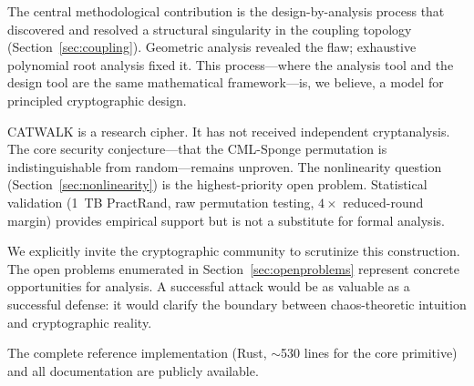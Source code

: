 \documentclass[runningheads]{llncs}
\begin{document}
The central methodological contribution is the design-by-analysis process
that discovered and resolved a structural singularity in the coupling topology
(Section~\ref{sec:coupling}).  Geometric analysis revealed the flaw;
exhaustive polynomial root analysis fixed it.  This process---where the
analysis tool and the design tool are the same mathematical framework---is,
we believe, a model for principled cryptographic design.

CATWALK is a research cipher.  It has not received independent cryptanalysis.
The core security conjecture---that the CML-Sponge permutation is
indistinguishable from random---remains unproven.  The nonlinearity question
(Section~\ref{sec:nonlinearity}) is the highest-priority open problem.
Statistical validation (1~TB PractRand, raw permutation testing, $4\times$
reduced-round margin) provides empirical support but is not a substitute for
formal analysis.

We explicitly invite the cryptographic community to scrutinize this
construction.  The open problems enumerated in Section~\ref{sec:openproblems}
represent concrete opportunities for analysis.  A successful attack would be
as valuable as a successful defense: it would clarify the boundary between
chaos-theoretic intuition and cryptographic reality.

The complete reference implementation (Rust, $\sim$530 lines for the core
primitive) and all documentation are publicly available.



\end{document}
